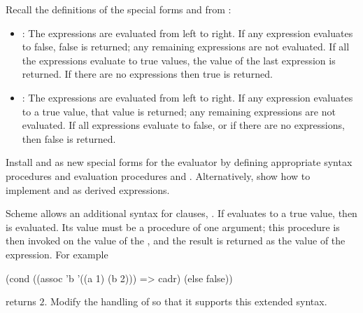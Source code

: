 \begin{exercise}
	\label{Exercise 4.4}
	Recall the definitions of the
	special forms  and  from :
	\begin{itemize}

		\item
			:
			The expressions are evaluated from left to right.
			If any expression evaluates to false, false is returned;
			any remaining expressions are not evaluated.
			If all the expressions evaluate to true values, the value of the last expression is returned.
			If there are no expressions then true is returned.


		\item
			:
			The expressions are evaluated from left to right.
			If any expression evaluates to a true value, that value is returned;
			any remaining expressions are not evaluated.
			If all expressions evaluate to false, or if there are no expressions, then false is returned.

	\end{itemize}

	Install  and  as new special forms for the evaluator by defining appropriate syntax procedures and evaluation procedures  and .
	Alternatively, show how to implement  and  as derived expressions.
\end{exercise}



\begin{exercise}
	\label{Exercise 4.5}
	Scheme allows an additional syntax for  clauses, .
	If  evaluates to a true value, then  is evaluated.
	Its value must be a procedure of one argument;
	this procedure is then invoked on the value of the , and the result is returned as the value of the  expression.
	For example
	\begin{scheme}
	  (cond ((assoc 'b '((a 1) (b 2))) => cadr)
	        (else false))
	\end{scheme}
	returns \( 2 \).
	Modify the handling of  so that it supports this extended syntax.
\end{exercise}



